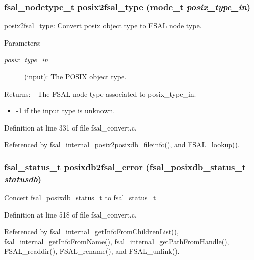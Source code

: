\subsubsection[{posix2fsal\_\-type}]{\setlength{\rightskip}{0pt plus 5cm}fsal\_\-nodetype\_\-t posix2fsal\_\-type (mode\_\-t {\em posix\_\-type\_\-in})}\label{fsal__convert_8c_ef52f65960ee7556010a7082de7b097e}


posix2fsal\_\-type: Convert posix object type to FSAL node type.

\begin{Desc}
\item[Parameters:]
\begin{description}
\item[{\em posix\_\-type\_\-in}](input): The POSIX object type.\end{description}
\end{Desc}
\begin{Desc}
\item[Returns:]- The FSAL node type associated to posix\_\-type\_\-in.\begin{itemize}
\item -1 if the input type is unknown. \end{itemize}
\end{Desc}


Definition at line 331 of file fsal\_\-convert.c.

Referenced by fsal\_\-internal\_\-posix2posixdb\_\-fileinfo(), and FSAL\_\-lookup().
\subsubsection[{posixdb2fsal\_\-error}]{\setlength{\rightskip}{0pt plus 5cm}fsal\_\-status\_\-t posixdb2fsal\_\-error (fsal\_\-posixdb\_\-status\_\-t {\em statusdb})}\label{fsal__convert_8c_9ea1023587982b3087afb63e2afe32b4}


Concert fsal\_\-posixdb\_\-status\_\-t to fsal\_\-status\_\-t 

Definition at line 518 of file fsal\_\-convert.c.

Referenced by fsal\_\-internal\_\-getInfoFromChildrenList(), fsal\_\-internal\_\-getInfoFromName(), fsal\_\-internal\_\-getPathFromHandle(), FSAL\_\-readdir(), FSAL\_\-rename(), and FSAL\_\-unlink().
